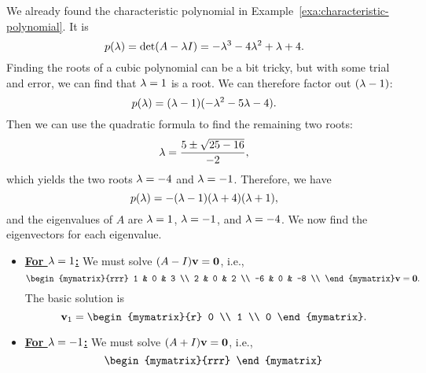 \begin{solution}
  We already found the characteristic polynomial in
  Example~\ref{exa:characteristic-polynomial}. It is
  \begin{equation*}
    p(\lambda) = \det(A-\lambda I) = -\lambda^3 -4\lambda^2 +\lambda + 4.
  \end{equation*}
  Finding the roots of a cubic polynomial can be a bit tricky, but
  with some trial and error, we can find that $\lambda=1$ is a
  root. We can therefore factor out $(\lambda-1)$:
  \begin{equation*}
    p(\lambda) = (\lambda-1)(-\lambda^2-5\lambda-4).
  \end{equation*}
  Then we can use the quadratic formula to find the remaining two
  roots:
  \begin{equation*}
    \lambda = \frac{5\pm\sqrt{25-16}}{-2},
  \end{equation*}
  which yields the two roots $\lambda=-4$ and $\lambda=-1$. Therefore,
  we have
  \begin{equation*}
    p(\lambda) = -(\lambda-1)(\lambda+4)(\lambda+1),
  \end{equation*}
  and the eigenvalues of $A$ are $\lambda=1$, $\lambda=-1$, and
  $\lambda=-4$. We now find the eigenvectors for each eigenvalue.
  \begin{itemize}
  \item {\bf{\underline{For $\lambda=1$:}}} We must solve
    $(A-I)\mbox{\bf v}=\mbox{\bf 0}$, i.e.,
    \begin{equation*}
      \begin{mymatrix}{rrr}
        1  & 0 & 3 \\
        2  & 0 & 2 \\
        -6 & 0 & -8 \\
      \end{mymatrix}\vect{v}=\vect{0}.
    \end{equation*}
    The basic solution is
    \begin{equation*}
      \vect{v}_1 = \begin{mymatrix}{r} 0 \\ 1 \\ 0 \end{mymatrix}.
    \end{equation*}
  \item {\bf{\underline{For $\lambda=-1$:}}} We must solve
    $(A+I)\mbox{\bf v}=\mbox{\bf 0}$, i.e.,
    \begin{equation*}
      \begin{mymatrix}{rrr}

\end{mymatrix}
\end{equation*}
\end{itemize}
\end{solution}
